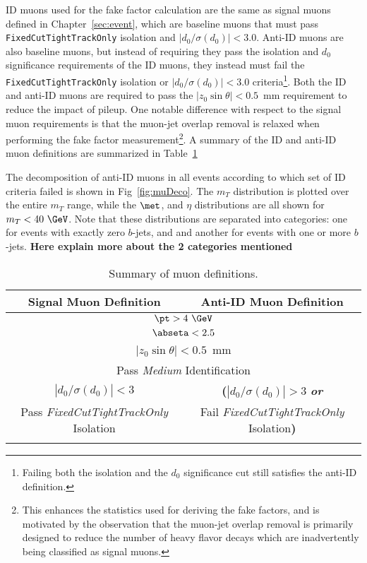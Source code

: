 ID muons used for the fake factor calculation are the same as signal muons defined in Chapter~\ref{sec:event}, which are baseline muons that must pass \texttt{FixedCutTightTrackOnly} isolation and $|d_0/\sigma(d_0)|<3.0$.  Anti-ID muons are also baseline muons, but instead of requiring they pass the isolation and $d_0$ significance requirements of the ID muons, they instead must fail the \texttt{FixedCutTightTrackOnly} isolation or $|d_0/\sigma(d_0)|<3.0$ criteria\footnote{Failing both the isolation and the $d_0$ significance cut still satisfies the anti-ID definition.}. Both the ID and anti-ID muons are required to pass the $|z_0\sin\theta| < 0.5$~mm requirement to reduce the impact of pileup.  One notable difference with respect to the signal muon requirements is that the muon-jet overlap removal is relaxed when performing the fake factor measurement\footnote{This enhances the statistics used for deriving the fake factors, and is motivated by the observation that the muon-jet overlap removal is primarily designed to reduce the number of heavy flavor decays which are inadvertently being classified as signal muons.}.  A summary of the ID and anti-ID muon definitions are summarized in Table~\ref{tab:AllMuDefs}

The decomposition of anti-ID muons in all events according to which set of ID criteria failed is shown in Fig~\ref{fig:muDeco}. The  $m_{T}$ distribution is plotted over the entire $m_{T}$ range, while the $\met$, \pt{} and $\eta$ distributions are all shown for $m_{T} <40~\GeV$.  Note that these distributions are separated into categories: one for events with exactly zero $b$-jets, and and another for events with one or more $b$-jets. \textbf{Here explain more about the 2 categories mentioned}

\begin{table}[!htb]
\begin{center}
\begin{tabular}{c|c}
\hline
Signal Muon Definition  & Anti-ID Muon Definition \\
\hline \hline
\multicolumn{2}{c}{$\pt > 4~\GeV$}      \\
\multicolumn{2}{c}{$\abseta < 2.5$ }     \\
\multicolumn{2}{c}{$|z_0\sin\theta| < 0.5$~mm} \\
\multicolumn{2}{c}{Pass \textit{Medium} Identification}     \\
$|d_0/\sigma(d_0)| < 3$  &   \textbf{(}$|d_0/\sigma(d_0)| > 3$ \textbf{\textit{or}}\\
Pass \textit{FixedCutTightTrackOnly} Isolation  & Fail \textit{FixedCutTightTrackOnly} Isolation\textbf{)} \\   \\
\hline
\end{tabular}
\caption{Summary of muon definitions.}
\label{tab:AllMuDefs}
\end{center}
\end{table}

